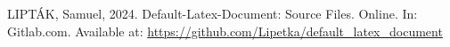 \begin{thebibliography}{1}

	LIPTÁK, Samuel, 2024. Default-Latex-Document: Source Files. Online. In: Gitlab.com. Available at: \url{https://github.com/Lipetka/default_latex_document}

\end{thebibliography}
